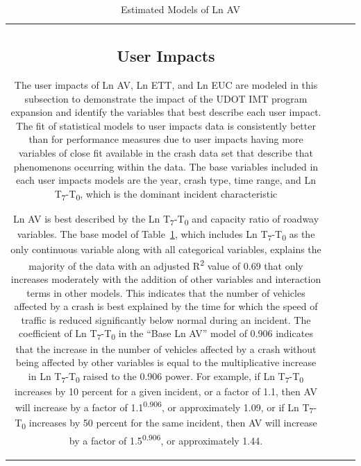 \documentclass[
  letterpaper,
  authoryear]{elsarticle}
\begin{document}
\begin{table}
{\begin{tabular}[t]{c|c|c|c}
\begin{table}
\begin{table}
{}

\end{table}%

\subsection{User Impacts}\label{user-impacts-1}

The user impacts of Ln AV, Ln ETT, and Ln EUC are modeled in this
subsection to demonstrate the impact of the UDOT IMT program expansion
and identify the variables that best describe each user impact. The fit
of statistical models to user impacts data is consistently better than
for performance measures due to user impacts having more variables of
close fit available in the crash data set that describe that phenomenons
occurring within the data. The base variables included in each user
impacts models are the year, crash type, time range, and Ln
T\textsubscript{7}-T\textsubscript{0}, which is the dominant incident
characteristic

Ln AV is best described by the Ln T\textsubscript{7}-T\textsubscript{0}
and capacity ratio of roadway variables. The base model of
Table~\ref{tbl-avmodels}, which includes Ln
T\textsubscript{7}-T\textsubscript{0} as the only continuous variable
along with all categorical variables, explains the majority of the data
with an adjusted R\textsuperscript{2} value of 0.69 that only increases
moderately with the addition of other variables and interaction terms in
other models. This indicates that the number of vehicles affected by a
crash is best explained by the time for which the speed of traffic is
reduced significantly below normal during an incident. The coefficient
of Ln T\textsubscript{7}-T\textsubscript{0} in the ``Base Ln AV'' model
of 0.906 indicates that the increase in the number of vehicles affected
by a crash without being affected by other variables is equal to the
multiplicative increase in Ln T\textsubscript{7}-T\textsubscript{0}
raised to the 0.906 power. For example, if Ln
T\textsubscript{7}-T\textsubscript{0} increases by 10 percent for a
given incident, or a factor of 1.1, then AV will increase by a factor of
1.1\textsuperscript{0.906}, or approximately 1.09, or if Ln
T\textsubscript{7}-T\textsubscript{0} increases by 50 percent for the
same incident, then AV will increase by a factor of
1.5\textsuperscript{0.906}, or approximately 1.44.

\begin{table}

\caption{\label{tbl-avmodels}Estimated Models of Ln AV}


\end{table}
\end{table}
\end{tabular}}
\end{table}
\end{document}
